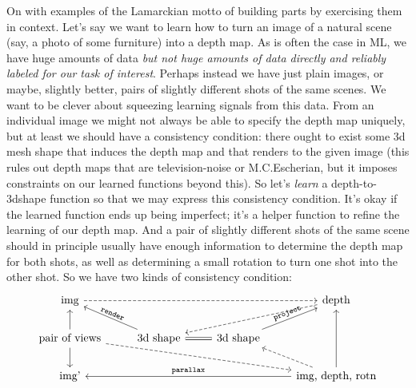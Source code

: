 On with examples of the Lamarckian motto of building parts by exercising them
in context.  Let's say we want to learn how to turn an image of a natural scene
(say, a photo of some furniture) into a depth map.  As is often
the case in ML, we have huge amounts of data \emph{but not huge amounts of data
directly and reliably labeled for our task of interest}.  Perhaps instead we
have just plain images, or maybe, slightly better, pairs of slightly different
shots of the same scenes.  We want to be clever about squeezing learning signals
from this data.  From an individual image we might not always be able
to specify the depth map uniquely, but at least we should have a consistency
condition: there ought to exist some 3d mesh shape that induces the depth map and
that renders to the given image (this rules out depth maps that are television-noise or M.C.Escherian,
but it imposes constraints on our learned functions beyond this).  So
let's \emph{learn} a depth-to-3dshape function so that we may express this consistency
condition.  It's okay if the learned function ends up being imperfect; it's
a helper function to refine the learning of our depth map.
%
And
a pair of slightly different shots of the same scene should in principle usually
have enough information to determine the depth map for both shots, as well as
determining a small rotation to turn one shot into the other shot.  So we have
two kinds of consistency condition:
$$
\begin{tikzcd}
\text{img} \arrow[rrr, dashed]                                &                                                                                 &                                                   & \text{depth} \arrow[lld, dashed]                                                            \\
\text{pair of views} \arrow[d] \arrow[u] \arrow[rrrd, dashed] & \text{3d shape} \arrow[r, equal] \arrow[lu, "\texttt{render}", sloped] & \text{3d shape} \arrow[ru, "\texttt{project}", sloped] &                                                                                             \\
\text{img'}                                                   &                                                                                 &                                                   & {\text{img, depth, rotn}} \arrow[uu] \arrow[lll, "\texttt{parallax}", sloped] \arrow[lu, dashed]
\end{tikzcd}
$$


